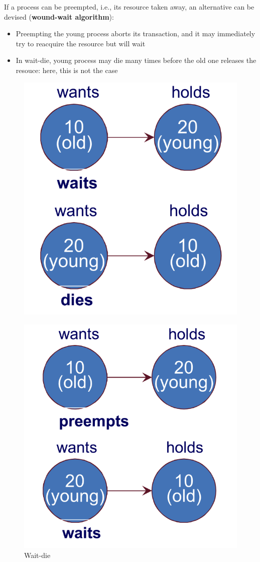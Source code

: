 \documentclass[10pt,a4paper]{article}
\begin{document}
If a process can be preempted, i.e., its resource taken away, an alternative can be devised (\textbf{wound-wait algorithm}):
\begin{itemize}
	\item Preempting the young process aborts its transaction, and it may immediately try to reacquire the resource but will wait
	\item In wait-die, young process may die many times before the old one releases the resouce: here, this is not the case
\end{itemize}
\begin{figure}[h!]
\centering
\begin{minipage}{.4\textwidth}
  \includegraphics[width=.9\linewidth]{images/wait-die.png}
  \label{fig:wait-die}
  \caption{Wait-die}
\end{minipage}%
\begin{minipage}{.4\textwidth}
  \includegraphics[width=.9\linewidth]{images/wound-wait.png}

\end{minipage}
\end{figure}
\end{document}
